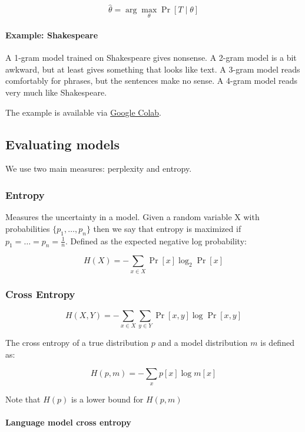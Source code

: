 \documentclass{idc_msc}
\begin{document}
\[
  \hat{\theta} = \arg\max_\theta \Pr[T \mid \theta]
\]

\paragraph{Example: Shakespeare}

A 1-gram model trained on Shakespeare gives nonsense.
A 2-gram model is a bit awkward, but at least gives something that looks like text.
A 3-gram model reads comfortably for phrases, but the sentences make no sense.
A 4-gram model reads very much like Shakespeare.

The example is available via \href{https://colab.research.google.com/drive/1862-2BvG3UFcugfnkj7mVfNk8BM4hENo}{Google Colab}.

\subsection{Evaluating models}

We use two main measures: perplexity and entropy.

\subsubsection{Entropy}

Measures the uncertainty in a model.
Given a random variable X with probabilities \(\{p_1, \ldots, p_n\}\) then we say that entropy is maximized if \(p_1 = \ldots = p_n = \frac{1}{n}\).
Defined as the expected negative log probability:

\[
  H(X) = -\sum_{x\in X} \Pr[x] \log_2 \Pr[x]
\]

\subsubsection{Cross Entropy}

\[
  H(X,Y) = - \sum_{x \in X}\sum_{y \in Y} \Pr[x,y] \log \Pr[x, y]
\]

The cross entropy of a true distribution \(p\) and a model distribution \(m\) is defined as:

\[
  H(p, m) = - \sum_{x} p[x] \log m[x]
\]

Note that \(H(p)\) is a lower bound for \(H(p, m)\)

\paragraph{Language model cross entropy}
\end{document}
